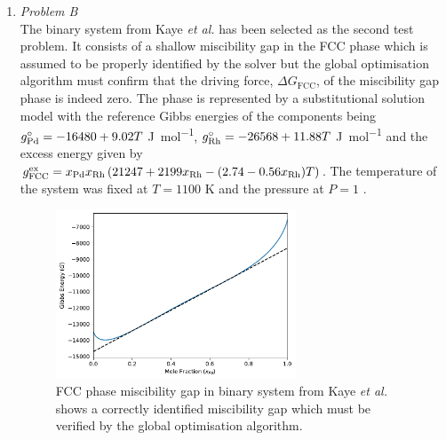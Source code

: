 \begin{enumerate}
	
	\item	\emph{Problem B}\\
		The binary   system from Kaye \textit{et al.} \cite{Kaye07} has been selected as the second test problem. It consists of a shallow miscibility gap in the FCC phase which is assumed to be properly identified by the solver but the global optimisation algorithm must confirm that the driving force, $\Delta G_\text{FCC}$, of the miscibility gap phase is indeed zero. The phase is represented by a substitutional solution model with the reference Gibbs energies of the components being $g_{\ce{Pd}}^\circ = -16480 + 9.02T$ \si{\joule \per \mole}, $g_{\ce{Rh}}^\circ = -26568 + 11.88 T$ \si{\joule \per \mole} and the excess energy given by $g_\text{FCC}^\text{ex} = x_{\ce{Pd}}x_{\ce{Rh}} \left(21247 + 2199 x_{\ce{Rh}} - (2.74 - 0.56x_{\ce{Rh}})T\right)$. The temperature of the system was fixed at $T = 1100$ \si{\kelvin} and the pressure at $P=1$ \si{\atmosphere}.
		\begin{figure}[htbp]			
			\centering
			\includegraphics[width=0.675\textwidth]{figures/chapter-6/System_PdRh.pdf}
			\caption[Global optimisation test problem B: FCC phase miscibility gap in  binary system.]{FCC phase miscibility gap in  binary system from Kaye \textit{et al.} \cite{Kaye07} shows a correctly identified miscibility gap which must be verified by the global optimisation algorithm.}
			\label{fig:testB}
		\end{figure}


\end{enumerate}
